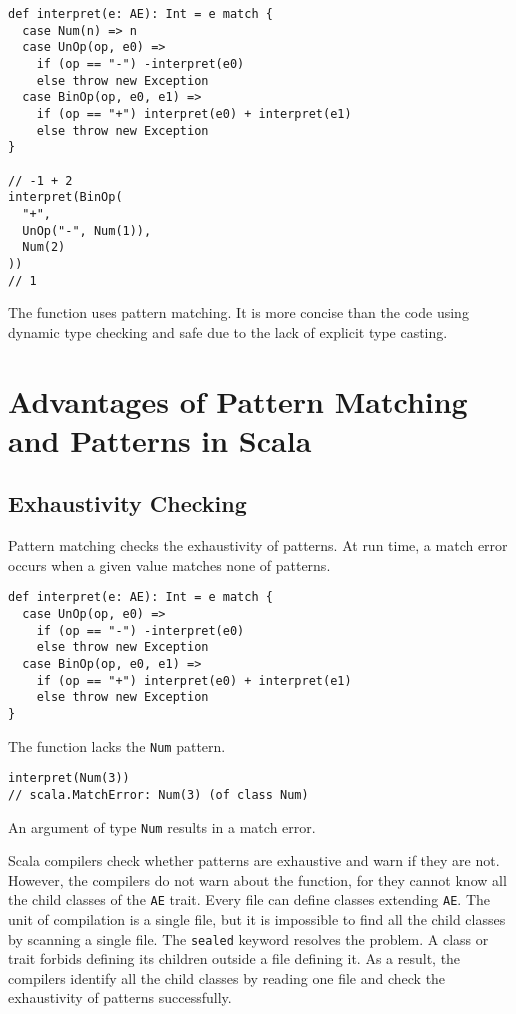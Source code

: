 \begin{verbatim}
def interpret(e: AE): Int = e match {
  case Num(n) => n
  case UnOp(op, e0) =>
    if (op == "-") -interpret(e0)
    else throw new Exception
  case BinOp(op, e0, e1) =>
    if (op == "+") interpret(e0) + interpret(e1)
    else throw new Exception
}

// -1 + 2
interpret(BinOp(
  "+",
  UnOp("-", Num(1)),
  Num(2)
))
// 1
\end{verbatim}

The function uses pattern matching. It is more concise than the code using
dynamic type checking and safe due to the lack of explicit type casting.

\section{Advantages of Pattern Matching and Patterns in Scala}

\subsection{Exhaustivity Checking}

Pattern matching checks the exhaustivity of patterns. At run time, a match error
occurs when a given value matches none of patterns.

\begin{verbatim}
def interpret(e: AE): Int = e match {
  case UnOp(op, e0) =>
    if (op == "-") -interpret(e0)
    else throw new Exception
  case BinOp(op, e0, e1) =>
    if (op == "+") interpret(e0) + interpret(e1)
    else throw new Exception
}
\end{verbatim}

The function lacks the \verb!Num! pattern.

\begin{verbatim}
interpret(Num(3))
// scala.MatchError: Num(3) (of class Num)
\end{verbatim}

An argument of type \verb!Num! results in a match error.

Scala compilers check whether patterns are exhaustive and warn if they are not.
However, the compilers do not warn about the function, for they cannot know all
the child classes of the \verb!AE! trait. Every file can define classes extending
\verb!AE!. The unit of compilation is a single file, but it is impossible to find
all the child classes by scanning a single file. The \verb!sealed! keyword
resolves the problem. A  class or trait forbids defining its
children outside a file defining it. As a result, the compilers identify all the
child classes by reading one file and check the exhaustivity of patterns
successfully.

